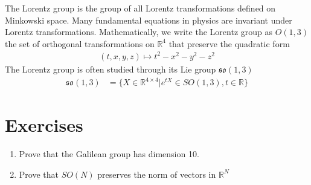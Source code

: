 \documentclass[book.tex]{subfiles}
\begin{document}
The Lorentz group is the group of all Lorentz transformations defined on Minkowski space. Many fundamental equations in physics are invariant under Lorentz transformations. Mathematically, we write the Lorentz group as $O(1, 3)$ the set of orthogonal transformations on $\mathbb{R}^4$ that preserve the quadratic form
\begin{align}
    (t, x, y, z) \mapsto t^2 - x^2 - y^2 - z^2 
\end{align}
The Lorentz group is often studied through its Lie group $\mathfrak{so}(1, 3)$
\begin{align}
    \mathfrak{so}(1, 3) &= \{ X \in \mathbb{R}^{4 \times 4} | e^{tX} \in SO(1, 3), t \in \mathbb{R} \}
\end{align}

\section{Exercises}
\begin{enumerate}
    \item Prove that the Galilean group has dimension 10.
    \item Prove that $SO(N)$ preserves the norm of vectors in $\mathbb{R}^N$
\end{enumerate}
\end{document}

